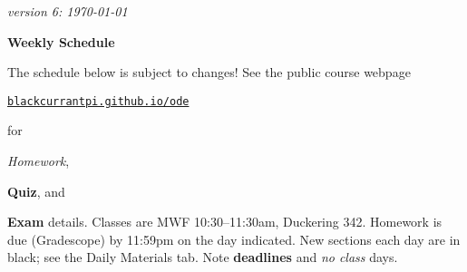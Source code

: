 \documentclass[12pt]{article}
\newcommand{\vacinline}[1]{{\color{OliveGreen} \textsl{#1}}}
\newcommand{\due}[1]{\strut {\color{BrickRed} \textsl{#1}}}
\newcommand{\ee}[1]{\strut {\color{Blue} \textbf{#1}}}
\newcommand{\dlinline}[1]{{\color{Purple} \textbf{#1}}}
\begin{document}
\hfill \small \emph{version 6: \today} \normalsize

\bigskip\bigskip
\centerline{\Large \textbf{Weekly Schedule}}

\bigskip
The schedule below is subject to changes!  See the public course webpage

\medskip

\centerline{\href{https://blackcurrantpi.github.io/ode}{\texttt{blackcurrantpi.github.io/ode}}}

\noindent for \due{Homework}, \ee{Quiz}, and \ee{Exam} details.  Classes are MWF 10:30--11:30am, Duckering 342.  Homework is due (Gradescope) by 11:59pm on the day indicated.  New sections each day are in black; see the Daily Materials tab.  Note \dlinline{deadlines} and \vacinline{no class} days.

\bigskip
\end{document}
